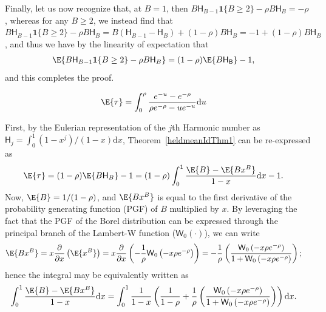 Finally, let us now recognize that, at $B = 1$, then
$
B \mathsf{H}_{B-1} \mathbf{1}\{B \geq 2\}
-
\rho B \mathsf{H}_{B}
=
-
\rho
$,
whereas for any $B \geq 2$, we instead find that
$
B \mathsf{H}_{B-1} \mathbf{1}\{B \geq 2\}
-
\rho B \mathsf{H}_{B}
=
B (\mathsf{H}_{B-1} - \mathsf{H}_B)
+
(1-\rho) B \mathsf{H}_{B}
=
-1
+
(1-\rho) B \mathsf{H}_{B}
$,
and thus we have by the linearity of expectation that
\begin{align}
\E{B \mathsf{H}_{B-1} \mathbf{1}\{B \geq 2\}
-
\rho B \mathsf{H}_{B}}
&=
(1-\rho)\E{B \mathsf{H}_\mathsf{B}}
-
1
,
\end{align}
and this completes the proof.
\hfill\Halmos\endproof



\begin{corollary}
\begin{align}
\E{\tau}
&=
\int_0^\rho
\frac{e^{-u} - e^{-\rho}}{\rho e^{-\rho} - u e^{-u}}\mathrm{d}u
\end{align}
\end{corollary}
First, by the Eulerian representation of the $j$th Harmonic number as $\mathsf{H}_j = \int_0^1 (1-x^j)/(1-x) \mathrm{d}x$, Theorem~\ref{heldmeanIdThm1} can be re-expressed as
\begin{align}
\E{\tau}
&=
(1-\rho)\E{B \mathsf{H}_B} - 1
=
(1-\rho)\int_0^1\frac{\E{B} - \E{B x^B}}{1-x}\mathrm{d}x
-
1
.
\end{align}
Now, $\E{B} = 1/(1-\rho)$, and $\E{B x^B}$ is equal to the first derivative of the probability generating function (PGF) of $B$ multiplied by $x$. By leveraging the fact that the PGF of the Borel distribution can be expressed through the principal branch of the Lambert-W function ($\mathsf{W}_0(\cdot)$), we can write
\begin{align}
\E{B x^B}
&=
x \frac{\partial}{\partial x}
\left(
\E{x^B}
\right)
=
x \frac{\partial}{\partial x}
\left(
-\frac{1}{\rho}\mathsf{W}_0\left(-x \rho e^{-\rho}\right)
\right)
=
-
\frac{1}{\rho}
\left(
\frac{\mathsf{W}_0\left(-x \rho e^{-\rho}\right)}
{1 + \mathsf{W}_0\left(-x \rho e^{-\rho}\right)}
\right)
;
\end{align}
hence the integral may be equivalently written as
\begin{align}
\int_0^1\frac{\E{B} - \E{B x^B}}{1-x}\mathrm{d}x
&=
\int_0^1\frac{1}{1-x}\left(\frac{1}{1-\rho} +  \frac{1}{\rho}
\left(
\frac{\mathsf{W}_0\left(-x \rho e^{-\rho}\right)}
{1 + \mathsf{W}_0\left(-x \rho e^{-\rho}\right)}
\right)\right)\mathrm{d}x
.
\end{align}

